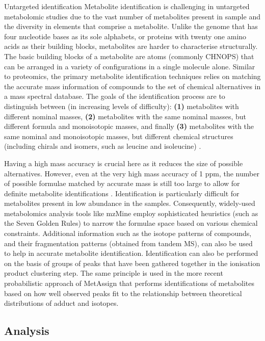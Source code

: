 Untargeted identification Metabolite identification is challenging in untargeted metabolomic studies due to the vast number of metabolites present in sample and the diversity in elements that comprise a metabolite. Unlike the genome that has four nucleotide bases as its sole alphabets, or proteins with twenty one amino acids as their building blocks, metabolites are harder to characterise structurally. The basic building blocks of a metabolite are atoms (commonly CHNOPS) that can be arranged in a variety of configurations in a single molecule alone. Similar to proteomics, the primary metabolite identification techniques relies on matching the accurate mass information of compounds to the set of chemical alternatives in a mass spectral database. The goals of the identification process are to distinguish between (in increasing levels of difficulty): \textbf{(1)} metabolites with different nominal masses, \textbf{(2)} metabolites with the same nominal masses, but different formula and monoisotopic masses, and finally \textbf{(3)} metabolites with the same nominal and monoisotopic masses, but different chemical structures (including chirals and isomers, such as leucine and isoleucine) \cite{Dunn2012}.

Having a high mass accuracy is crucial here as it reduces the size of possible alternatives. However, even at the very high mass accuracy of 1 ppm, the number of possible formulae matched by accurate mass is still too large to allow for definite metabolite identifications \cite{Kind2006}. Identification is particularly difficult for metabolites present in low abundance in the samples. Consequently, widely-used metabolomics analysis tools like mzMine \cite{Pluskal2010} employ sophisticated heuristics (such as the Seven Golden Rules) to narrow the formulae space based on various chemical constraints. Additional information such as the isotope patterns of compounds, and their fragmentation patterns (obtained from tandem MS), can also be used to help in accurate metabolite identification. Identification can also be performed on the basis of groups of peaks that have been gathered together in the ionisation product clustering step. The same principle is used in the more recent probabilistic approach of MetAssign \cite{Daly2014} that performs identifications of metabolites based on how well observed peaks fit to the relationship between theoretical distributions of adduct and isotopes. 

\subsection{Analysis}

